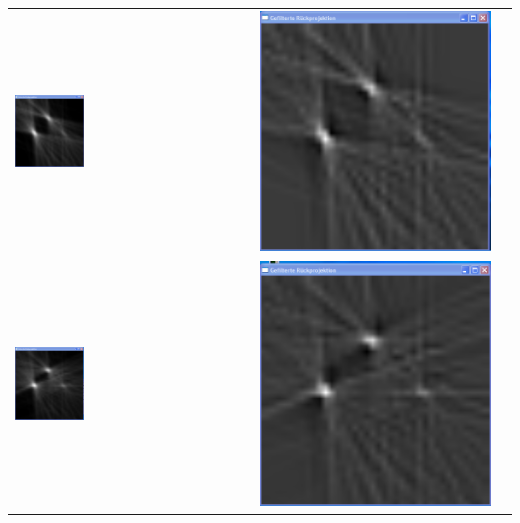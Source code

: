 \begin{longtable}{p{7cm}p{7cm}c}
    	                \includegraphics[width=0.3\textwidth, height=0.2\textheight]{pic/Einzelfenster_Bilder/unbekannte_Quelle/unbek3einf_prj.png}
    	                & 
    	                \includegraphics[width=.3\textwidth, height=0.2\textheight]{pic/Einzelfenster_Bilder/unbekannte_Quelle/unbek3gef_prj.png}\\               
    	                \includegraphics[width=0.3\textwidth, height=0.2\textheight]{pic/Einzelfenster_Bilder/unbekannte_Quelle/unbek4einf_prj.png}
    	                & 
    	                \includegraphics[width=.3\textwidth, height=0.2\textheight]{pic/Einzelfenster_Bilder/unbekannte_Quelle/unbek4gef_prj.png} \\
    	            \end{longtable}
    	            \ \\
    	            
